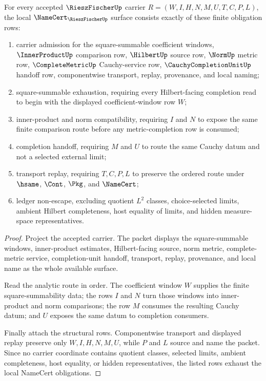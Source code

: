 \begin{theorem}
\label{thm:riesz-fischer-namecert-obligations}
For every accepted $\RieszFischerUp$ carrier $R=(W,I,H,N,M,U,T,C,P,L)$, the local $\NameCert_{\RieszFischerUp}$ surface consists exactly of these finite obligation rows:
\begin{enumerate}
\item carrier admission for the square-summable coefficient windows, $\InnerProductUp$ comparison row, $\HilbertUp$ source row, $\NormUp$ metric row, $\CompleteMetricUp$ Cauchy-service row, $\CauchyCompletionUnitUp$ handoff row, componentwise transport, replay, provenance, and local naming;
\item square-summable exhaustion, requiring every Hilbert-facing completion read to begin with the displayed coefficient-window row $W$;
\item inner-product and norm compatibility, requiring $I$ and $N$ to expose the same finite comparison route before any metric-completion row is consumed;
\item completion handoff, requiring $M$ and $U$ to route the same Cauchy datum and not a selected external limit;
\item transport replay, requiring $T,C,P,L$ to preserve the ordered route under $\hsame$, $\Cont$, $\Pkg$, and $\NameCert$;
\item ledger non-escape, excluding quotient $L^{2}$ classes, choice-selected limits, ambient Hilbert completeness, host equality of limits, and hidden measure-space representatives.
\end{enumerate}
\end{theorem}
\begin{proof}
Project the accepted carrier. The packet displays the square-summable windows, inner-product estimates, Hilbert-facing source, norm metric, complete-metric service, completion-unit handoff, transport, replay, provenance, and local name as the whole available surface.

Read the analytic route in order. The coefficient window $W$ supplies the finite square-summability data; the rows $I$ and $N$ turn those windows into inner-product and norm comparisons; the row $M$ consumes the resulting Cauchy datum; and $U$ exposes the same datum to completion consumers.

Finally attach the structural rows. Componentwise transport and displayed replay preserve only $W,I,H,N,M,U$, while $P$ and $L$ source and name the packet. Since no carrier coordinate contains quotient classes, selected limits, ambient completeness, host equality, or hidden representatives, the listed rows exhaust the local NameCert obligations.
\end{proof}

